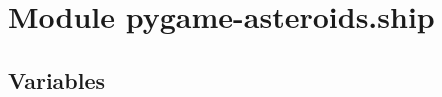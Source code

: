 %
%
%


\section{Module pygame-asteroids.ship}

    \label{pygame-asteroids:ship}


  \subsection{Variables}

